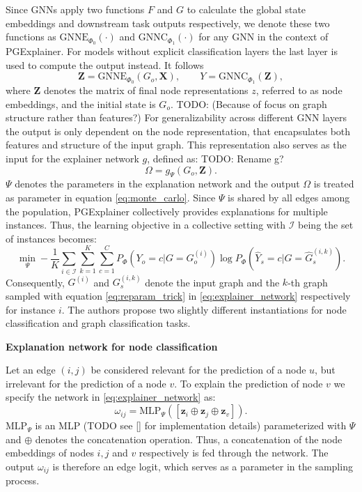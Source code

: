 Since GNNs apply two functions $F$ and $G$ to calculate the global state embeddings and downstream task outputs respectively, we denote these two functions as $\text{GNNE}_{\Phi_0}(\cdot)$ and $\text{GNNC}_{\Phi_1}(\cdot)$ for any GNN in the context of PGExplainer. For models without explicit classification layers the last layer is used to compute the output instead. It follows
\begin{equation}
    \mathbf{Z} = \text{GNNE}_{\Phi_0}(G_o, \mathbf{X}), \qquad Y = \text{GNNC}_{\Phi_1}(\mathbf{Z}),
\end{equation}
where $\mathbf{Z}$ denotes the matrix of final node representations $z$, referred to as node embeddings, and the initial state is $G_o$. TODO: (Because of focus on graph structure rather than features?) For generalizability across different GNN layers the output is only dependent on the node representation, that encapsulates both features and structure of the input graph. This representation also serves as the input for the explainer network $g$, defined as:
TODO: Rename g?
\begin{equation}
    \label{eq:explainer_network}
    \Omega = g_\Psi(G_o,\mathbf{Z}).
\end{equation}
$\Psi$ denotes the parameters in the explanation network and the output $\Omega$ is treated as parameter in equation \ref{eq:monte_carlo}. Since $\Psi$ is shared by all edges among the population, PGExplainer collectively provides explanations for multiple instances. Thus, the learning objective in a collective setting with $\mathcal{I}$ being the set of instances becomes:
\begin{equation}
    \min_\Psi -\frac{1}{K}\sum_{i\in \mathcal{I}}\sum_{k=1}^K\sum_{c=1}^C P_\Phi (Y_o = c|G = G_o^{(i)}) \log P_\Phi(\hat{Y}_s = c|G=\hat{G}_s^{(i,k)}).
\end{equation}
Consequently, $G^{(i)}$ and $G_s^{(i,k)}$ denote the input graph and the $k$-th graph sampled with equation \ref{eq:reparam_trick} in \ref{eq:explainer_network} respectively for instance $i$. The authors propose two slightly different instantiations for node classification and graph classification tasks. \bigskip

\textbf{Explanation network for node classification}

Let an edge $(i,j)$ be considered relevant for the prediction of a node $u$, but irrelevant for the prediction of a node $v$. To explain the prediction of node $v$ we specify the network in \ref{eq:explainer_network} as:
\begin{equation}
    \omega_{ij} = \text{MLP}_\Psi ([\mathbf{z}_i\oplus\mathbf{z}_j\oplus\mathbf{z}_v]).
\end{equation}
$\text{MLP}_\Psi$ is an MLP (TODO see \ref{} for implementation details) parameterized with $\Psi$ and $\oplus$ denotes the concatenation operation. Thus, a concatenation of the node embeddings of nodes $i, j$ and $v$ respectively is fed through the network. The output $\omega_{ij}$ is therefore an edge logit, which serves as a parameter in the sampling process.

